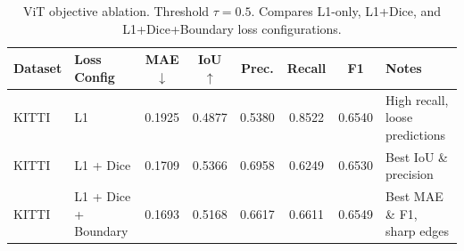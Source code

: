 \begin{table}[h]
  \centering
  \caption{ViT objective ablation. Threshold $\tau=0.5$. Compares L1-only, L1+Dice, and L1+Dice+Boundary loss configurations.}
  \label{tab:vit_objective_ablation}
  \begin{tabularx}{\linewidth}{llccccc>{\raggedright\arraybackslash}X}
    \toprule
    Dataset & Loss Config & MAE $\downarrow$ & IoU $\uparrow$ & Prec. & Recall & F1 & Notes \\
    \midrule
    KITTI & L1 & 0.1925 & 0.4877 & 0.5380 & 0.8522 & 0.6540 & High recall, loose predictions \\
    KITTI & L1 + Dice & 0.1709 & 0.5366 & 0.6958 & 0.6249 & 0.6530 & Best IoU \& precision \\
    KITTI & L1 + Dice + Boundary & 0.1693 & 0.5168 & 0.6617 & 0.6611 & 0.6549 & Best MAE \& F1, sharp edges \\
    \bottomrule
  \end{tabularx}
\end{table}
